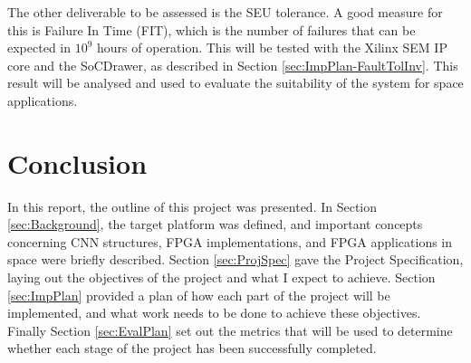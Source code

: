 \documentclass[12pt]{article}
\begin{document}
The other deliverable to be assessed is the SEU tolerance. A good measure for this is Failure In Time (FIT), which is the number of failures that can be expected in $10^9$ hours of operation. This will be tested with the Xilinx SEM IP core and the SoCDrawer, as described in Section \ref{sec:ImpPlan-FaultTolInv}. This result will be analysed and used to evaluate the suitability of the system for space applications.

\section{Conclusion}
\label{sec:Conclusion}
\vspace{-12pt}

In this report, the outline of this project was presented. In Section \ref{sec:Background}, the target platform was defined, and important concepts concerning CNN structures, FPGA implementations, and FPGA applications in space were briefly described. Section \ref{sec:ProjSpec} gave the Project Specification, laying out the objectives of the project and what I expect to achieve. Section \ref{sec:ImpPlan} provided a plan of how each part of the project will be implemented, and what work needs to be done to achieve these objectives. Finally Section \ref{sec:EvalPlan} set out the metrics that will be used to determine whether each stage of the project has been successfully completed. 



\nocite{*}
\end{document}
